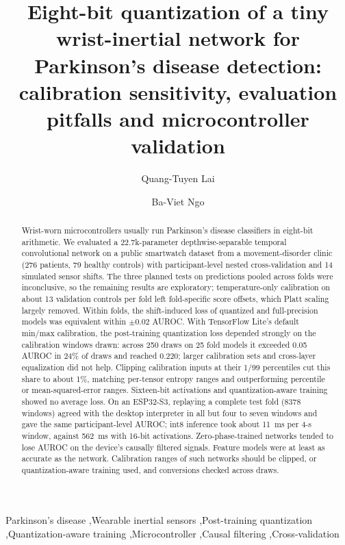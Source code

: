 \documentclass[preprint,12pt]{elsarticle}
\begin{document}
\begin{frontmatter}

\title{Eight-bit quantization of a tiny wrist-inertial network for Parkinson's disease detection: calibration sensitivity, evaluation pitfalls and microcontroller validation}

\author[hcmute]{Quang-Tuyen Lai}

\author[hcmute]{Ba-Viet Ngo}


\begin{abstract}
Wrist-worn microcontrollers usually run Parkinson's disease classifiers in eight-bit arithmetic. We evaluated a 22.7k-parameter depthwise-separable temporal convolutional network on a public smartwatch dataset from a movement-disorder clinic (276 patients, 79 healthy controls) with participant-level nested cross-validation and 14 simulated sensor shifts. The three planned tests on predictions pooled across folds were inconclusive, so the remaining results are exploratory; temperature-only calibration on about 13 validation controls per fold left fold-specific score offsets, which Platt scaling largely removed. Within folds, the shift-induced loss of quantized and full-precision models was equivalent within $\pm0.02$ AUROC. With TensorFlow Lite's default min/max calibration, the post-training quantization loss depended strongly on the calibration windows drawn: across 250 draws on 25 fold models it exceeded 0.05 AUROC in 24\% of draws and reached 0.220; larger calibration sets and cross-layer equalization did not help. Clipping calibration inputs at their 1/99 percentiles cut this share to about 1\%, matching per-tensor entropy ranges and outperforming percentile or mean-squared-error ranges. Sixteen-bit activations and quantization-aware training showed no average loss. On an ESP32-S3, replaying a complete test fold (8378 windows) agreed with the desktop interpreter in all but four to seven windows and gave the same participant-level AUROC; int8 inference took about 11~ms per 4-s window, against 562~ms with 16-bit activations. Zero-phase-trained networks tended to lose AUROC on the device's causally filtered signals. Feature models were at least as accurate as the network. Calibration ranges of such networks should be clipped, or quantization-aware training used, and conversions checked across draws.
\end{abstract}

\begin{keyword}
Parkinson's disease \sep Wearable inertial sensors \sep Post-training quantization \sep Quantization-aware training \sep Microcontroller \sep Causal filtering \sep Cross-validation
\end{keyword}

\end{frontmatter}
\end{document}
